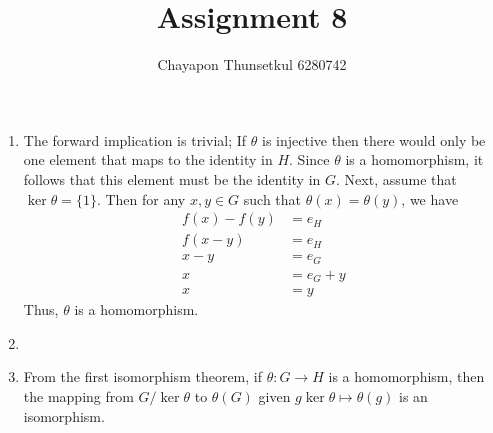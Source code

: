 \documentclass[]{article}
\title{Assignment 8}
\author{Chayapon Thunsetkul 6280742}
\begin{document}
\maketitle
\begin{enumerate}
    \item The forward implication is trivial; If $\theta$ is injective then there would only be one element that maps to the identity in $H$. Since $\theta$ is a homomorphism, it follows that this element must be the identity in $G$. Next, assume that $\ker \theta = \{1\}$. Then for any $x,y \in G$ such that $\theta(x) = \theta(y)$, we have \begin{align*}
        f(x) - f(y) &= e_H\\
        f(x-y) &= e_H\\
        x-y &= e_G\\
        x &= e_G + y\\
        x &=y
    \end{align*} Thus, $\theta$ is a homomorphism.
    \item
    \item From the first isomorphism theorem, if $\theta:G \rightarrow H$ is a homomorphism, then the mapping from $G/ \ker \theta$ to $\theta(G)$ given $g \ker \theta \mapsto \theta(g)$ is an isomorphism.


\end{enumerate}
\end{document}
